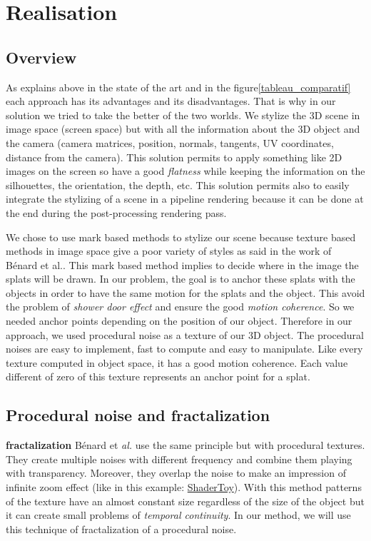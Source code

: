 \chapter{Realisation}


\section{Overview}

As explains above in the state of the art and in the figure\ref{tableau_comparatif} each approach has its advantages and its disadvantages. That is why in our solution we tried to take the better of the two worlds. We stylize the 3D scene in image space (screen space) but with all the information about the 3D object and the camera (camera matrices, position, normals, tangents, UV coordinates, distance from the camera). This solution permits to apply something like 2D images on the screen so have a good \textit{flatness} while keeping the information on the silhouettes, the orientation, the depth, etc. This solution permits also to easily integrate the stylizing of a scene in a pipeline rendering because it can be done at the end during the post-processing rendering pass. \newline

We chose to use mark based methods to stylize our scene because texture based methods in image space give a poor variety of styles as said in the work of Bénard et al.\cite{benard_dynamic_2009}. This mark based method implies to decide where in the image the splats will be drawn. In our problem, the goal is to anchor these splats with the objects in order to have the same motion for the splats and the object. This avoid the problem of \textit{shower door effect} and ensure the good \textit{motion coherence}. So we needed anchor points depending on the position of our object. Therefore in our approach, we used procedural noise\cite{perlin_improving_2002} as a texture of our 3D object. The procedural noises are easy to implement, fast to compute and easy to manipulate. Like every texture computed in object space, it has a good motion coherence. Each value different of zero of this texture represents an anchor point for a splat.


\section{Procedural noise and fractalization}


\textbf{fractalization}
 Bénard et \textit{al.}\cite{benard_dynamic_2010} use the same principle but with procedural textures. They create multiple noises with different frequency and combine them playing with transparency. Moreover, they overlap the noise to make an impression of infinite zoom effect (like in this example: \href{https://www.shadertoy.com/view/XlBXWw?fbclid=IwAR1fU2JxQzXtks1ZcmVmzrHiv646G8w2gWceeiV-UToeFkAFMQ2NecbsGGs}{ShaderToy}). With this method patterns of the texture have an almost constant size regardless of the size of the object but it can create small problems of \textit{temporal continuity}. In our method, we will use this technique of fractalization of a procedural noise. \newline

